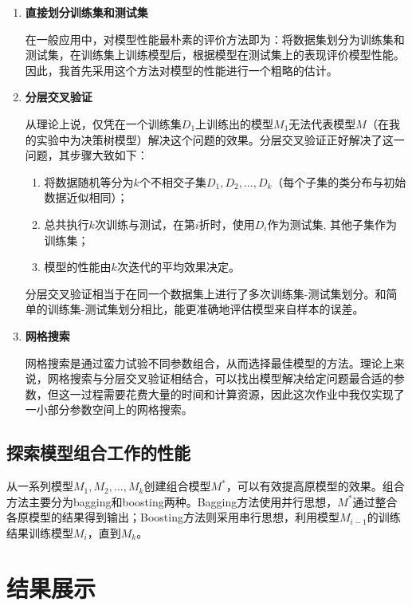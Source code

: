 \documentclass[12pt,a4paper]{article}
\theoremstyle{definition}
\begin{document}
\begin{enumerate}
\item \textbf{直接划分训练集和测试集}

在一般应用中，对模型性能最朴素的评价方法即为：将数据集划分为训练集和测试集，在训练集上训练模型后，根据模型在测试集上的表现评价模型性能。因此，我首先采用这个方法对模型的性能进行一个粗略的估计。

\item \textbf{分层交叉验证}

从理论上说，仅凭在一个训练集$D_1$上训练出的模型$M_1$无法代表模型$M$（在我的实验中为决策树模型）解决这个问题的效果。分层交叉验证正好解决了这一问题，其步骤大致如下：

\begin{enumerate}
	\item 将数据随机等分为$k$个不相交子集$D_1, D_2, ... ,D_k$（每个子集的类分布与初始数据近似相同）；
	
	\item 总共执行$k$次训练与测试，在第$i$折时，使用$D_i$作为测试集, 其他子集作为训练集；
	
	\item 模型的性能由$k$次迭代的平均效果决定。
\end{enumerate}

分层交叉验证相当于在同一个数据集上进行了多次训练集-测试集划分。和简单的训练集-测试集划分相比，能更准确地评估模型来自样本的误差。

\item \textbf{网格搜索}

网格搜索是通过蛮力试验不同参数组合，从而选择最佳模型的方法。理论上来说，网格搜索与分层交叉验证相结合，可以找出模型解决给定问题最合适的参数，但这一过程需要花费大量的时间和计算资源，因此这次作业中我仅实现了一小部分参数空间上的网格搜索。

\end{enumerate}

\subsection{探索模型组合工作的性能}

从一系列模型$M_1, M_2, ... , M_k$创建组合模型$M^*$，可以有效提高原模型的效果。组合方法主要分为bagging和boosting两种。Bagging方法使用并行思想，$M^*$通过整合各原模型的结果得到输出；Boosting方法则采用串行思想，利用模型$M_{i-1}$的训练结果训练模型$M_{i}$，直到$M_k$。

\section{结果展示}
\end{document}
